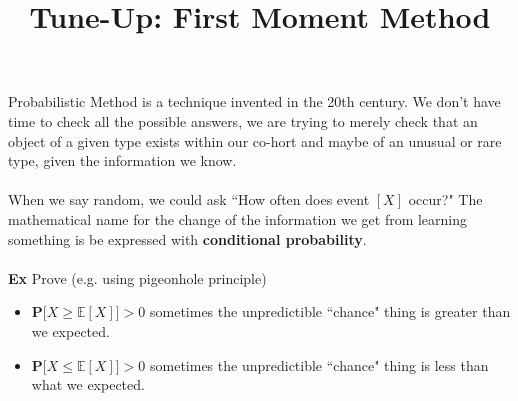 \documentclass[12pt]{article}
\title{Tune-Up: First Moment Method}
\date{}
\begin{document}
\sffamily

\maketitle

{\fontsize{16pt}{16pt}\selectfont 

\noindent Probabilistic Method is a technique invented in the 20th century.  We don't have time to check all the possible answers, we are trying to merely check that an object of a given type exists within our co-hort and maybe of an unusual or rare type, given the information we know. \\ \\
When we say random, we could ask ``How often does event $[X]$ occur?" The mathematical name for the change of the information we get from learning something is be expressed with \textbf{conditional probability}.   \\ \\
\textbf{Ex} Prove (e.g. using pigeonhole principle)

\begin{itemize}

\item $\mathbf{P}\big[X \geq \mathbb{E}[X]\big] > 0$ sometimes the unpredictible ``chance" thing is greater than we expected.

\item $\mathbf{P}\big[X \leq \mathbb{E}[X]\big] > 0$ sometimes the unpredictible ``chance" thing is less than what we expected. 


\end{itemize}}
\end{document}
